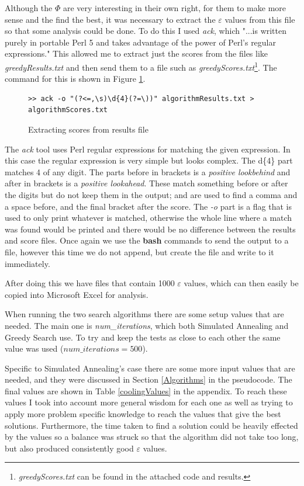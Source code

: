 \documentclass[12pt]{report}
\begin{document}
Although the $\Phi$ are very interesting in their own right, for them to make more sense and the find the best, it was necessary to extract the $\varepsilon$ values from this file so that some analysis could be done. To do this I used \textit{ack}\cite{ack}, which "...is written purely in portable Perl 5 and takes advantage of the power of Perl's regular expressions." This allowed me to extract just the scores from the files like \textit{greedyResults.txt} and then send them to a file such as \textit{greedyScores.txt}\footnote{\textit{greedyScores.txt} can be found in the attached code and results.}. The command for this is shown in Figure \ref{ackCommand}.

\begin{figure}[H]
\caption{Extracting scores from results file}
\label{ackCommand}
\begin{verbatim}
>> ack -o "(?<=,\s)\d{4}(?=\))" algorithmResults.txt > algorithmScores.txt
\end{verbatim}
\end{figure}

The \textit{ack} tool uses Perl regular expressions for matching the given expression. In this case the regular expression is very simple but looks complex. The d\{4\} part matches 4 of any digit. The parts before in brackets is a \textit{positive lookbehind} and after in brackets is a \textit{positive lookahead}. These match something before or after the digits but do not keep them in the output; and are used to find a comma and a space before, and the final bracket after the score. The \textit{-o} part is a flag that is used to only print whatever is matched, otherwise the whole line where a match was found would be printed and there would be no difference between the results and score files. Once again we use the \textbf{bash} commands to send the output to a file, however this time we do not append, but create the file and write to it immediately.

After doing this we have files that contain 1000 $\varepsilon$ values, which can then easily be copied into Microsoft Excel for analysis.

When running the two search algorithms there are some setup values that are needed. The main one is \textit{num\_iterations}, which both Simulated Annealing and Greedy Search use. To try and keep the tests as close to each other the same value was used ($num\_iterations = 500$).

Specific to Simulated Annealing's case there are some more input values that are needed, and they were discussed in Section \ref{Algorithms} in the pseudocode. The final values are shown in Table \ref{coolingValues} in the appendix. To reach these values I took into account more general wisdom for each one as well as trying to apply more problem specific knowledge to reach the values that give the best solutions. Furthermore, the time taken to find a solution could be heavily effected by the values so a balance was struck so that the algorithm did not take too long, but also produced consistently good $\varepsilon$ values.
\end{document}
